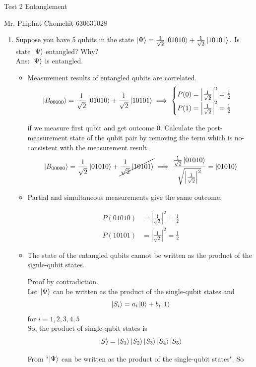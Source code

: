 \documentclass[12pt, a4paper]{article}
\begin{document}
	\begin{center}
		Test 2  Entanglement
	\end{center}
	
	Mr. Phiphat Chomchit 630631028
	\begin{enumerate}
		\item Suppose you have 5 qubits in the state  $\ket{\Psi} = \frac{1}{\sqrt{2}}\ket{01010} + \frac{1}{\sqrt{2}}\ket{10101} .$ Is state $\ket{\Psi}$ entangled? Why?\\
		
		Ans: $\ket{\Psi}$ is entangled.
		\begin{itemize}
			\item Measurement results of entangled qubits are correlated.
			$$\ket{B_{00000} } =  \frac{1}{\sqrt{2}}\ket{01010} + \frac{1}{\sqrt{2}}\ket{10101} \implies 
			\begin{cases}
				P(0) =  \left|\frac{1}{\sqrt{2}}\right|^2 = \frac{1}{2}\\
				P(1) =  \left|\frac{1}{\sqrt{2}}\right|^2 = \frac{1}{2}
			\end{cases}
			$$
			
			if we measure first qubit and get outcome 0. Calculate the post-measurement state of the qubit pair by removing the term which is no-consistent with the measurement result.
			$$\ket{B_{00000} } = \frac{1}{\sqrt{2}}\ket{01010} + \cancel{\frac{1}{\sqrt{2}}\ket{10101}} \implies \frac{\frac{1}{\sqrt{2}}\ket{01010}}{\sqrt{\left|\frac{1}{\sqrt{2}}\right|^2}} = \ket{01010}$$
			\item Partial and simultaneous measurements give the same outcome.
			
			\begin{align}
				P(01010) &= \left|\frac{1}{\sqrt{2}}\right|^2 = \frac{1}{2}\\
				P(10101) &= \left|\frac{1}{\sqrt{2}}\right|^2 = \frac{1}{2}
			\end{align}
			\item The state of the entangled qubits cannot be written as the product of the signle-qubit states.
			
			Proof by contradiction.\\
			Let $\ket{\Psi}$ can be written as the product of the single-qubit states and
			$$\ket{S_i} = a_i\ket{0} + b_i\ket{1}$$
			for $i = 1, 2, 3, 4, 5$\\
			So, the product of single-qubit states is
			$$\ket{S} = \ket{S_1}\ket{S_2}\ket{S_3}\ket{S_4}\ket{S_5}$$
			
			From "$\ket{\Psi}$ can be written as the product of the single-qubit states". So
			

\end{itemize}
\end{enumerate}
\end{document}
